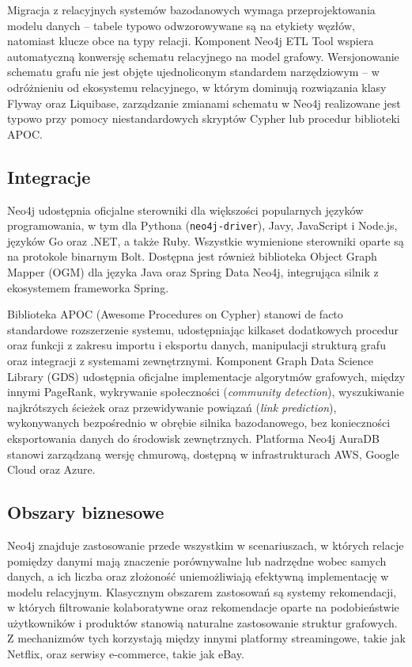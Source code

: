 Migracja z relacyjnych systemów bazodanowych wymaga przeprojektowania modelu
danych -- tabele typowo odwzorowywane są na etykiety węzłów, natomiast klucze
obce na typy relacji. Komponent Neo4j ETL Tool wspiera automatyczną konwersję
schematu relacyjnego na model grafowy. Wersjonowanie schematu grafu nie jest
objęte ujednoliconym standardem narzędziowym -- w odróżnieniu od ekosystemu
relacyjnego, w którym dominują rozwiązania klasy Flyway oraz Liquibase,
zarządzanie zmianami schematu w Neo4j realizowane jest typowo przy pomocy
niestandardowych skryptów Cypher lub procedur biblioteki APOC.

\subsection{Integracje}

Neo4j udostępnia oficjalne sterowniki dla większości popularnych języków
programowania, w tym dla Pythona (\texttt{neo4j-driver}), Javy, JavaScript
i Node.js, języków Go oraz .NET, a także Ruby. Wszystkie wymienione sterowniki
oparte są na protokole binarnym Bolt. Dostępna jest również biblioteka
Object Graph Mapper (OGM) dla języka Java oraz Spring Data Neo4j, integrująca
silnik z ekosystemem frameworka Spring.

Biblioteka APOC (Awesome Procedures on Cypher) stanowi de facto standardowe
rozszerzenie systemu, udostępniając kilkaset dodatkowych procedur oraz funkcji
z zakresu importu i eksportu danych, manipulacji strukturą grafu oraz
integracji z systemami zewnętrznymi. Komponent Graph Data Science Library
(GDS) udostępnia oficjalne implementacje algorytmów grafowych, między innymi
PageRank, wykrywanie społeczności (\textit{community detection}), wyszukiwanie
najkrótszych ścieżek oraz przewidywanie powiązań (\textit{link prediction}),
wykonywanych bezpośrednio w obrębie silnika bazodanowego, bez konieczności
eksportowania danych do środowisk zewnętrznych. Platforma Neo4j AuraDB
stanowi zarządzaną wersję chmurową, dostępną w infrastrukturach AWS, Google
Cloud oraz Azure.

\subsection{Obszary biznesowe}

Neo4j znajduje zastosowanie przede wszystkim w scenariuszach, w których
relacje pomiędzy danymi mają znaczenie porównywalne lub nadrzędne wobec samych
danych, a ich liczba oraz złożoność uniemożliwiają efektywną implementację
w modelu relacyjnym. Klasycznym obszarem zastosowań są systemy rekomendacji,
w których filtrowanie kolaboratywne oraz rekomendacje oparte na podobieństwie
użytkowników i produktów stanowią naturalne zastosowanie struktur grafowych.
Z mechanizmów tych korzystają między innymi platformy streamingowe, takie
jak Netflix, oraz serwisy e-commerce, takie jak eBay.

